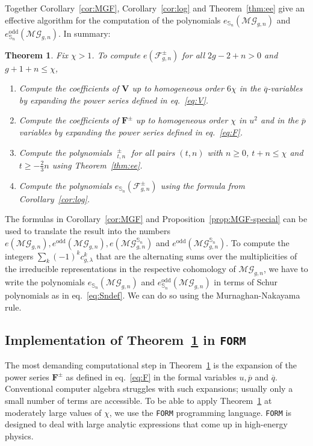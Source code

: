 \documentclass[oneside]{amsart}
\newtheorem{theorem}{Theorem}[section]
\theoremstyle{remark}
\newcommand{\bb}[1]{{\overline{#1}}}
\DeclareMathOperator{\SG}{{\mathbb S}}
\DeclareMathOperator{\ee}{\widehat{e}}
\newcommand{\MG}{\mathcal{MG}}
\newcommand{\F}{\mathcal{F}}
\begin{document}
%
%

%
%
%

Together Corollary~\ref{cor:MGF}, Corollary~\ref{cor:log} and Theorem~\ref{thm:ee} give an effective algorithm for the computation of the polynomials $e_{\SG_n}(\MG_{g,n})$ and $e_{\SG_n}^\mathrm{odd}(\MG_{g,n})$. In summary:

\begin{theorem}
\label{thm:comp}
Fix $\chi >1$.
To compute $e(\F^\pm_{g,n})$ for all $2g-2+n > 0$ and $g+1+n \leq \chi$,
\begin{enumerate}
\item Compute the coefficients of $\mathbf{V}$ up to homogeneous order $6\chi$ in the $\bb q$-variables by expanding the power series defined in eq.~\eqref{eq:V}.
\item Compute the coefficients of $\mathbf{F}^\pm$ up to homogeneous order $\chi$ in $u^2$ and in the $\bb p$ variables by expanding the power series defined in eq.~\eqref{eq:F}.
\item Compute the polynomials $\ee_{t,n}^\pm$ for all pairs $(t,n)$ with $n \geq 0$, $t + n \leq \chi$ and $t \geq -\frac23 n$ using Theorem~\ref{thm:ee}.
\item Compute the polynomials $e_{\SG_n}(\F^\pm_{g,n})$ using the formula from Corollary~\ref{cor:log}.
\end{enumerate}
\end{theorem}

The formulas in Corollary~\ref{cor:MGF} and Proposition~\ref{prop:MGF-special} can be used to translate the result into the numbers $e(\MG_{g,n}),e^\mathrm{odd}(\MG_{g,n}),e(\MG_{g,n}^{\SG_n})$ and $e^\mathrm{odd}(\MG_{g,n}^{\SG_n})$.
To compute the integers $\sum_k (-1)^k c^k_{g,\lambda}$ that are the alternating sums over the multiplicities of the irreducible representations in the respective cohomology of $\MG_{g,n}$, we have to write the polynomials $e_{\SG_n}(\MG_{g,n})$ and $e_{\SG_n}^\mathrm{odd}(\MG_{g,n})$ in terms of Schur polynomials as in eq.~\eqref{eq:Sndef}. We can do so using the Murnaghan-Nakayama rule.

\subsection{Implementation of Theorem~\ref{thm:comp} in \texorpdfstring{\texttt{FORM}}{FORM}}
\label{sec:form}

The most demanding computational step in Theorem~\ref{thm:comp} is the expansion of the power series $\mathbf F^\pm$ as defined in eq.~\eqref{eq:F} in the formal variables $u,\bb p$ and $\bb q$. Conventional computer algebra struggles with such expansions; usually only a small number of terms are accessible. To be able to apply Theorem~\ref{thm:comp} at moderately large values of $\chi$, we use the \texttt{FORM} programming language. \texttt{FORM} is designed to deal with large analytic expressions that come up in high-energy physics.
\end{document}
